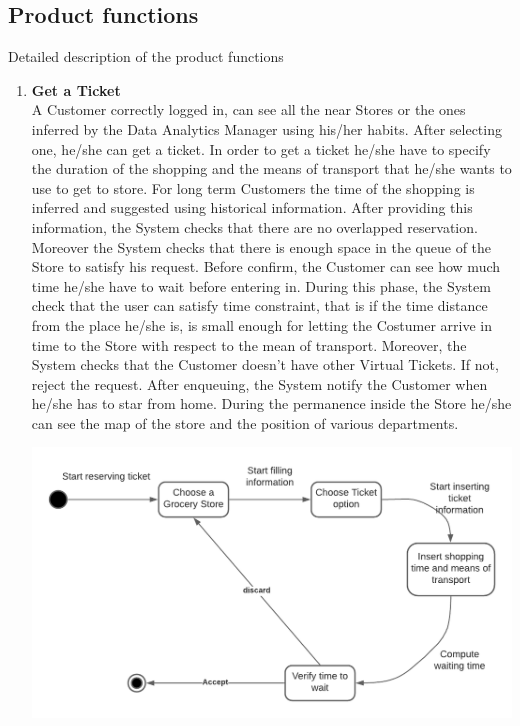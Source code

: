 \documentclass[a4paper, 12pt, oneside]{article}
\begin{document}
\subsection{Product functions}
Detailed description of the product functions

\begin{enumerate}
    \item \textbf{Get a Ticket} 
    \\
    A Customer correctly logged in, can see all the near Stores or the ones inferred by the Data Analytics Manager using his/her habits. After selecting one, he/she can get a ticket. In order to get a ticket he/she have to specify the duration of the shopping and the means of transport that he/she wants to use to get to store. For long term Customers the time of the shopping is inferred and suggested using historical information.
        After providing this information, the System checks that there are no overlapped reservation. Moreover the System checks that there is enough space in the queue of the Store to satisfy his request.
        Before confirm, the Customer can see how much time he/she have to wait before entering in. During this phase, the System check that the user can satisfy time constraint, that is if the time distance from the place he/she is, is small enough for letting the Costumer arrive in time to the Store with respect to the mean of transport. Moreover, the System checks that the Customer doesn't have other Virtual Tickets. If not, reject the request.
        After enqueuing, the System notify the Customer when he/she has to star from home.
        During the permanence inside the Store he/she can see the map of the store and the position of various departments.
     \\
        \begin{minipage}{\linewidth}
            \centering
           \includegraphics[height=0.3\textheight, scale=0.2, keepaspectratio]{img/Get_Ticket_diagram.png}
        \end{minipage}
    

\end{enumerate}
\end{document}
